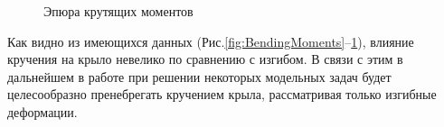 %

%

%

\begin{figure}[H]
\centering
\def\svgwidth{0.9\textwidth}

\caption{Эпюра крутящих моментов}
\label{fig:RotatingMoments}
\end{figure}


Как видно из имеющихся данных (Рис.\ref{fig:BendingMoments}--\ref{fig:RotatingMoments}), влияние кручения на крыло невелико по сравнению с изгибом. В связи с этим в дальнейшем в работе при решении некоторых модельных задач будет целесообразно пренебрегать кручением крыла, рассматривая только изгибные деформации. 

